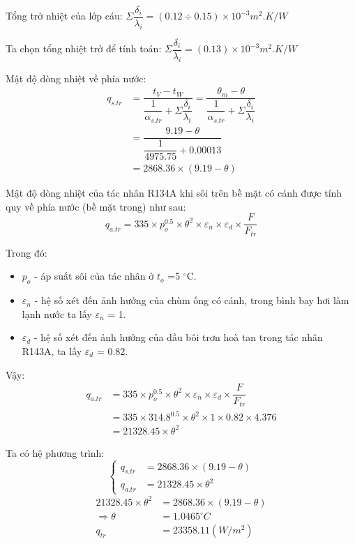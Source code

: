 Tổng trở nhiệt của lớp cáu:
$\Sigma \dfrac{\delta_{i}}{\lambda_{i}} = (0.12 \div 0.15)\times 10^{-3} m^2.K/W$

Ta chọn tổng nhiệt trở để tính toán: $\Sigma \dfrac{\delta_{i}}{\lambda_{i}} = (0.13)\times 10^{-3} m^2.K/W$

Mật độ dòng nhiệt về phía nước:
\begin{equation*}
	\begin{split}
		q_{s.tr} &= \dfrac{t_{V} - t_{W}}{\dfrac{1}{\alpha_{s.tr}} + \Sigma \dfrac{\delta_{i}}{\lambda_{i}}} = \dfrac{\theta_{m} - \theta}{\dfrac{1}{\alpha_{s.tr}} + \Sigma \dfrac{\delta_{i}}{\lambda_{i}}}\\
		&= \dfrac{9.19 - \theta}{\dfrac{1}{4975.75}+0.00013}\\
		&= 2868.36 \times (9.19 - \theta)
	\end{split}
\end{equation*}

Mật độ dòng nhiệt của tác nhân R134A khi sôi trên bề mặt có cánh được tính quy về phía nước (bề mặt trong) như sau:
\begin{equation*}
	q_{a.tr} = 335\times p_{o}^{0.5}\times\theta^2\times\varepsilon_{n}\times\varepsilon_{d}\times\dfrac{F}{F_{tr}}
\end{equation*}

Trong đó:
\begin{itemize}
	\item $p_{o}$ - áp suất sôi của tác nhân ở $t_{o}$ =5 $^{\circ}$C.
	\item $\varepsilon_{n}$ - hệ số xét đến ảnh hưởng của chùm ống có cánh, trong bình bay hơi làm lạnh nước ta lấy $\varepsilon_{n}$ = 1.
	\item $\varepsilon_{d}$ - hệ số xét đến ảnh hưởng của dầu bôi trơn hoà tan trong tác nhân R143A, ta lấy $\varepsilon_{d}$ = 0.82.
\end{itemize}

Vậy:
\begin{equation*}
	\begin{split}
		q_{a.tr} &= 335\times p_{o}^{0.5}\times\theta^2\times\varepsilon_{n}\times\varepsilon_{d}\times\dfrac{F}{F_{tr}}\\
		&= 335 \times 314.8^{0.5} \times \theta^2 \times 1 \times 0.82 \times 4.376\\
		&= 21328.45 \times \theta^2
	\end{split}
\end{equation*}

Ta có hệ phương trình:
\begin{equation*}
	\begin{cases}
		q_{s.tr} &= 2868.36\times(9.19 - \theta)\\
		q_{a.tr} &= 21328.45\times\theta^2
	\end{cases}
\end{equation*}
\begin{equation*}
	\begin{split}
	21328.45\times\theta^2 &= 2868.36\times(9.19 - \theta)\\
	\Rightarrow \theta &= 1.0465^{\circ}C\\
				q_{tr} &=23358.11(W/m^2)
	\end{split}
\end{equation*}

